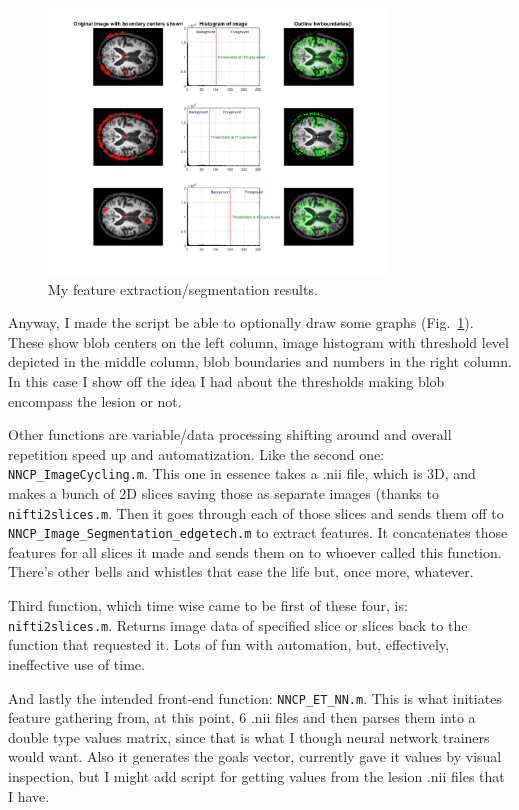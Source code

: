 \documentclass[12pt]{article}
\begin{document}
\begin{figure}[!htb]
\centering
\includegraphics[width=0.8\textwidth]{img/meh}
\caption{My feature extraction/segmentation results.}
\label{fig:meh}
\end{figure}

Anyway, I made the script be able to optionally draw some graphs (Fig.~\ref{fig:meh}). These show blob centers on the left column, image histogram with threshold level depicted in the middle column, blob boundaries and numbers in the right column. In this case I show off the idea I had about the thresholds making blob encompass the lesion or not.

Other functions are variable/data processing shifting around and overall repetition speed up and automatization. Like the second one: \texttt{NNCP\_ImageCycling.m}. This one in essence takes a .nii file, which is 3D, and makes a bunch of 2D slices saving those as separate images (thanks to \texttt{nifti2slices.m}. Then it goes through each of those slices and sends them off to \texttt{NNCP\_Image\_Segmentation\_edgetech.m} to extract features. It concatenates those features for all slices it made and sends them on to whoever called this function. There's other bells and whistles that ease the life but, once more, whatever.

Third function, which time wise came to be first of these four, is: \texttt{nifti2slices.m}. Returns image data of specified slice or slices back to the function that requested it. Lots of fun with automation, but, effectively, ineffective use of time.

And lastly the intended front-end function: \texttt{NNCP\_ET\_NN.m}. This is what initiates feature gathering from, at this point, 6 .nii files and then parses them into a double type values matrix, since that is what I though neural network trainers would want. Also it generates the goals vector, currently gave it values by visual inspection, but I might add script for getting values from the lesion .nii files that I have.
\end{document}
